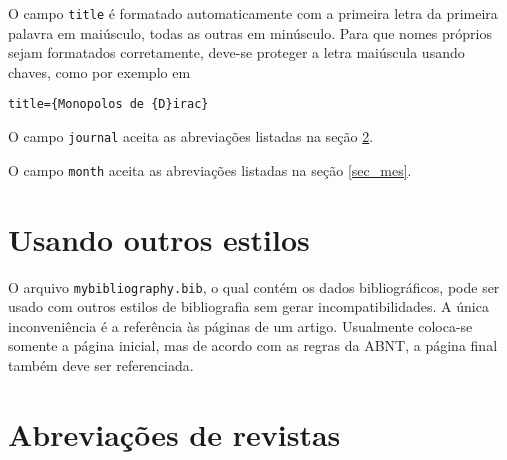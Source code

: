 \documentclass[a4paper,12pt]{article}
\newcommand{\ca}{\c{c}\~ao}
\newcommand{\co}{\c{c}\~oes}
\begin{document}
			O campo \verb+title+ \'e formatado automaticamente com a primeira 
			letra da primeira palavra em mai\'usculo, todas as outras em min\'usculo. 
			Para que nomes pr\'oprios sejam formatados
			corretamente, deve-se proteger a letra mai\'uscula usando
			chaves, como por exemplo em
			\begin{center}
				\verb+title={Monopolos de {D}irac}+
			\end{center}
			
			O campo \verb+journal+ aceita as abrevia{\co} listadas na
			se{\ca} \ref{revistas}.
			
			O campo \verb+month+ aceita as abrevia{\co} listadas na
			se{\ca} \ref{sec_mes}.
			
			
			
			
			\section{Usando outros estilos}
			
			
			O arquivo \verb+mybibliography.bib+, o qual cont\'em os dados 
			bibliogr\'aficos, pode ser usado com outros estilos de bibliografia
			sem gerar incompatibilidades. A \'unica inconveni\^encia \'e a
			refer\^encia \`as p\'aginas de um artigo. Usualmente coloca-se somente
			a p\'agina inicial, mas de acordo com as regras da ABNT, a p\'agina
			final tamb\'em deve ser referenciada.
			
			
			
			\section{Abrevia{\co} de revistas}
			\label{revistas}
			
\end{document}
